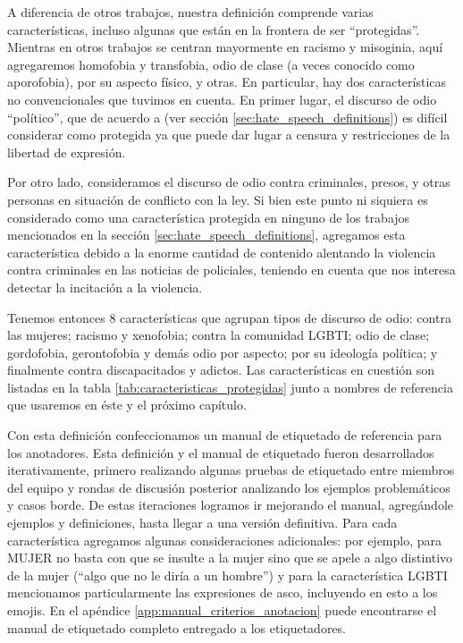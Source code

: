 A diferencia de otros trabajos, nuestra definición comprende varias características, incluso algunas que están en la frontera de ser ``protegidas''. Mientras en otros trabajos se centran mayormente en racismo y misoginia, aquí agregaremos homofobia y transfobia, odio de clase (a veces conocido como aporofobia), por su aspecto físico, y otras. En particular, hay dos características no convencionales que tuvimos en cuenta. En primer lugar, el discurso de odio ``político'', que de acuerdo a \citet{CIDH2015} (ver sección \ref{sec:hate_speech_definitions}) es difícil considerar como protegida ya que puede dar lugar a censura y restricciones de la libertad de expresión.

Por otro lado, consideramos el discurso de odio contra criminales, presos, y otras personas en situación de conflicto con la ley. Si bien este punto ni siquiera es considerado como una característica protegida en ninguno de los trabajos mencionados en la sección \ref{sec:hate_speech_definitions}, agregamos esta característica debido a la enorme cantidad de contenido alentando la violencia contra criminales en las noticias de policiales, teniendo en cuenta que nos interesa detectar la incitación a la violencia.

Tenemos entonces 8 características que agrupan tipos de discurso de odio: contra las mujeres; racismo y xenofobia; contra la comunidad LGBTI; odio de clase; gordofobia, gerontofobia y demás odio por aspecto; por su ideología política; y finalmente contra discapacitados y adictos. Las características en cuestión son listadas en la tabla \ref{tab:caracteristicas_protegidas} junto a nombres de referencia que usaremos en éste y el próximo capítulo.

Con esta definición confeccionamos un manual de etiquetado de referencia para los anotadores. Esta definición y el manual de etiquetado fueron desarrollados iterativamente, primero realizando algunas pruebas de etiquetado entre miembros del equipo y rondas de discusión posterior analizando los ejemplos problemáticos y casos borde. De estas iteraciones logramos ir mejorando el manual, agregándole ejemplos y definiciones, hasta llegar a una versión definitiva. Para cada característica agregamos algunas consideraciones adicionales: por ejemplo, para MUJER no basta con que se insulte a la mujer sino que se apele a algo distintivo de la mujer (``algo que no le diría a un hombre'') y para la característica LGBTI mencionamos particularmente las expresiones de asco, incluyendo en esto a los emojis. En el apéndice \ref{app:manual_criterios_anotacion} puede encontrarse el manual de etiquetado completo entregado a los etiquetadores.


